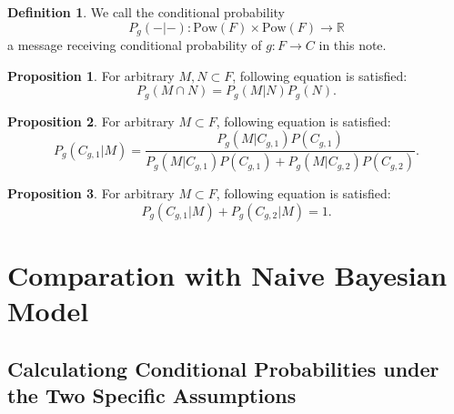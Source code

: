 \documentclass[11pt, a4note]{article}
\theoremstyle{definition}
\newtheorem{definition}{Definition}[section]
\newtheorem{proposition}{Proposition}[section]
\begin{document}
\begin{definition}
We call the conditional probability 
\begin{equation}
P_{g}(-|-): \mathrm{Pow}(F) \times \mathrm{Pow}(F) \to \mathbb{R}
\end{equation}
a message receiving conditional probability of $ g : F \to C $ in this note.
\end{definition}

\begin{proposition}
For arbitrary $ M, N \subset F $, following equation is satisfied:
\begin{equation}
P_{g}(M \cap N) = P_{g}(M | N)P_{g}(N).
\end{equation}
\end{proposition}

\begin{proposition}
For arbitrary $ M \subset F $, following equation is satisfied:
\begin{equation}
P_{g}(C_{g,1}|M) = \frac{P_{g}(M|C_{g,1})P(C_{g,1})}{P_{g}(M|C_{g,1})P(C_{g,1}) + P_{g}(M|C_{g,2})P(C_{g,2})}.
\end{equation}
\end{proposition}

\begin{proposition}
For arbitrary $ M \subset F $, following equation is satisfied:
\begin{equation}
P_{g}(C_{g,1}|M) + P_{g}(C_{g,2}|M) = 1.
\end{equation}
\end{proposition}

\section{Comparation with Naive Bayesian Model}

\subsection{Calculationg Conditional Probabilities under the Two Specific Assumptions}
\end{document}
